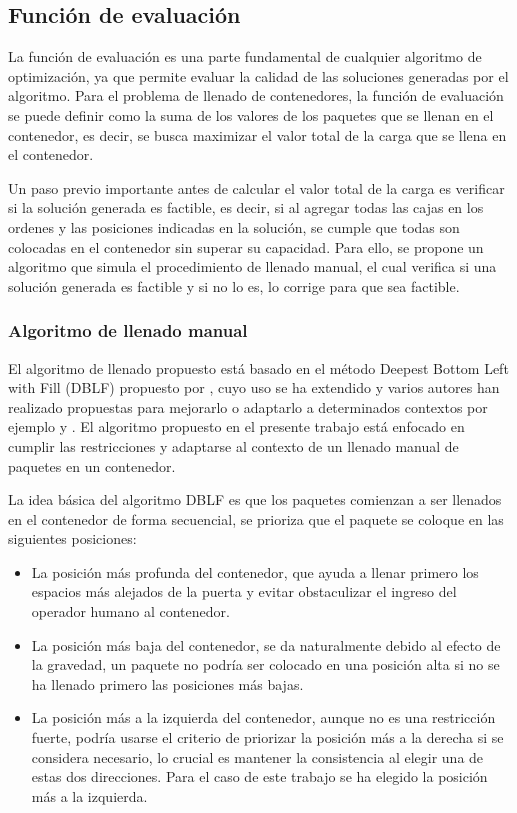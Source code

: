\documentclass[openany]{article}
\begin{document}
\subsection{Función de evaluación}

La función de evaluación es una parte fundamental de cualquier algoritmo de optimización, ya que permite evaluar la calidad de las soluciones generadas por el algoritmo. Para el problema de llenado de contenedores, la función de evaluación se puede definir como la suma de los valores de los paquetes que se llenan en el contenedor, es decir, se busca maximizar el valor total de la carga que se llena en el contenedor.

Un paso previo importante antes de calcular el valor total de la carga es verificar si la solución generada es factible, es decir, si al agregar todas las cajas en los ordenes y las posiciones indicadas en la solución, se cumple que todas son colocadas en el contenedor sin superar su capacidad. Para ello, se propone un algoritmo que simula el procedimiento de llenado manual, el cual verifica si una solución generada es factible y si no lo es, lo corrige para que sea factible.

\subsubsection{Algoritmo de llenado manual}

El algoritmo de llenado propuesto está basado en el método Deepest Bottom Left with Fill (DBLF) propuesto por \cite{karabulut2004hybrid}, cuyo uso se ha extendido y varios autores han realizado propuestas para mejorarlo o adaptarlo a determinados contextos por ejemplo \cite{wang2010hybrid} y \cite{kang2012hybrid}. El algoritmo propuesto en el presente trabajo está enfocado en cumplir las restricciones y adaptarse al contexto de un llenado manual de paquetes en un contenedor.

La idea básica del algoritmo DBLF es que los paquetes comienzan a ser llenados en el contenedor de forma secuencial, se prioriza que el paquete se coloque en las siguientes posiciones:

\begin{itemize}
    \item La posición más profunda del contenedor, que ayuda a llenar primero los espacios más alejados de la puerta y evitar obstaculizar el ingreso del operador humano al contenedor.
    \item La posición más baja del contenedor, se da naturalmente debido al efecto de la gravedad, un paquete no podría ser colocado en una posición alta si no se ha llenado primero las posiciones más bajas.
    \item La posición más a la izquierda del contenedor, aunque no es una restricción fuerte, podría usarse el criterio de priorizar la posición más a la derecha si se considera necesario, lo crucial es mantener la consistencia al elegir una de estas dos direcciones. Para el caso de este trabajo se ha elegido la posición más a la izquierda.
\end{itemize}
\end{document}
